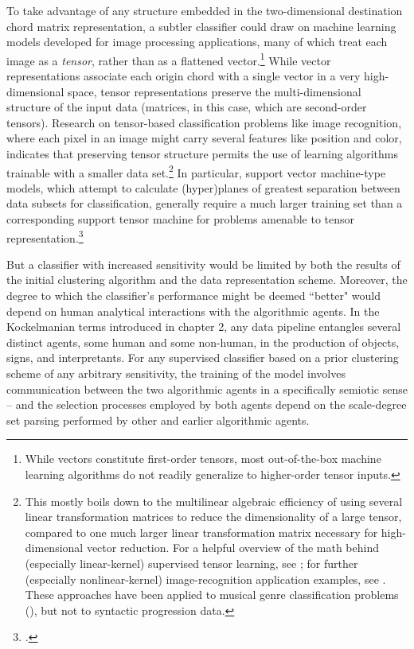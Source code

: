 To take advantage of any structure embedded in the two-dimensional destination chord matrix representation, a subtler classifier could draw on machine learning models developed for image processing applications, many of which treat each image as a \emph{tensor}, rather than as a flattened vector.\footnote{While vectors constitute first-order tensors, most out-of-the-box machine learning algorithms do not readily generalize to higher-order tensor inputs.}  While vector representations associate each origin chord with a single vector in a very high-dimensional space, tensor representations preserve the multi-dimensional structure of the input data (matrices, in this case, which are second-order tensors).  Research on tensor-based classification problems like image recognition, where each pixel in an image might carry several features like position and color, indicates that preserving tensor structure permits the use of learning algorithms trainable with a smaller data set.\footnote{This mostly boils down to the multilinear algebraic efficiency of using several linear transformation matrices to reduce the dimensionality of a large tensor, compared to one much larger linear transformation matrix necessary for high-dimensional vector reduction.  For a helpful overview of the math behind (especially linear-kernel) supervised tensor learning, see \cite{tao2005}; for further (especially nonlinear-kernel) image-recognition application examples, see \cite{he2014}.  These approaches have been applied to musical genre classification problems (\cite{panagakis2009}), but not to syntactic progression data.}  In particular, support vector machine-type models, which attempt to calculate (hyper)planes of greatest separation between data subsets for classification, generally require a much larger training set than a corresponding support tensor machine for problems amenable to tensor representation.\footnote{\cite{he2014}.}

But a classifier with increased sensitivity would be limited by both the results of the initial clustering algorithm and the data representation scheme.  Moreover, the degree to which the classifier's performance might be deemed ``better" would depend on human analytical interactions with the algorithmic agents.  In the Kockelmanian terms introduced in chapter 2, any data pipeline entangles several distinct agents, some human and some non-human, in the production of objects, signs, and interpretants.  For any supervised classifier based on a prior clustering scheme of any arbitrary sensitivity, the training of the model involves communication between the two algorithmic agents in a specifically semiotic sense -- and the selection processes employed by both agents depend on the scale-degree set parsing performed by other and earlier algorithmic agents.  

